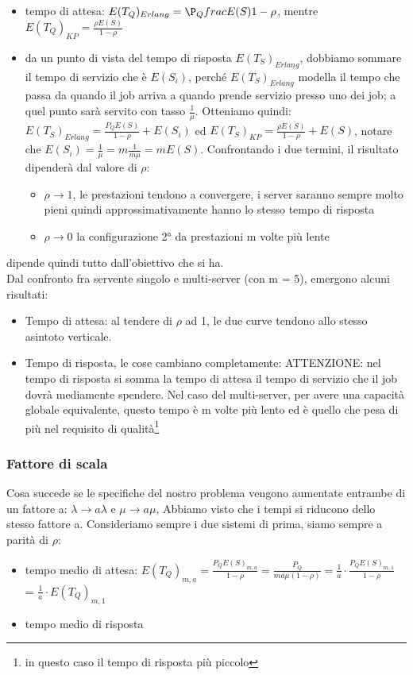 \documentclass{article}
\begin{document}
\begin{itemize}
\item tempo di attesa: $E(T_Q)_{Erlang} = \P_Qfrac{E(S)}{1 - \rho}$, mentre $E(T_Q)_{KP} = \frac{\rho E(S)}{1 - \rho}$
\item da un punto di vista del tempo di risposta $E(T_S)_{Erlang}$, dobbiamo sommare il tempo di servizio che è $E(S_i)$, perché $E(T_S)_{Erlang}$ modella il tempo che passa da quando il job arriva a quando prende servizio presso uno dei job; a quel punto sarà servito con tasso $\frac{1}{\mu}$.
Otteniamo quindi: $E(T_S)_{Erlang} = \frac{P_Q E(S)}{1 - \rho}+E(S_i)$ ed $E(T_S)_{KP} = \frac{\rho E(S)}{1 - \rho} + E(S)$, notare che $E(S_i) = \frac{1}{\mu} = m \frac{1}{m \mu} = mE(S)$. Confrontando i due termini, il risultato dipenderà dal valore di $\rho$:
\begin{itemize}
\item $\rho \longrightarrow 1$, le prestazioni tendono a convergere, i server saranno sempre molto pieni quindi approssimativamente hanno lo stesso tempo di risposta
\item $\rho \longrightarrow 0$ la configurazione 2° da prestazioni m volte più lente
\end{itemize}
\end{itemize}
dipende quindi tutto dall'obiettivo che si ha.\\ Dal confronto fra servente singolo e multi-server (con m = 5), emergono alcuni risultati:
\begin{itemize}
\item Tempo di attesa: al tendere di $\rho$ ad 1, le due curve tendono allo stesso asintoto verticale.
\item Tempo di risposta, le cose cambiano completamente: ATTENZIONE: nel tempo di risposta si somma la tempo di attesa il tempo di servizio che il job dovrà mediamente spendere. Nel caso del multi-server, per avere una capacità globale equivalente, questo tempo è m volte più lento ed è quello che pesa di più nel requisito di qualità\footnote{in questo caso il tempo di risposta più piccolo} 
\end{itemize}
\subsubsection{Fattore di scala}
Cosa succede se le specifiche del nostro problema vengono aumentate entrambe di un fattore a: $\lambda \rightarrow a\lambda$ e $\mu \rightarrow a\mu$, Abbiamo visto che i tempi si riducono dello stesso fattore a. Consideriamo sempre i due sistemi di prima, siamo sempre a parità di $\rho$:
\begin{itemize}
\item tempo medio di attesa: $E(T_Q)_{m,a} = \frac{P_Q E(S)_{m,a}}{1 - \rho} = \frac{P_Q}{ma \mu (1 - \rho)} = \frac{1}{a}\cdot \frac{P_Q E(S)_{m,1}}{1 - \rho}$ = $\frac{1}{a}\cdot E(T_Q)_{m,1}$ 
\item tempo medio di risposta
\end{itemize}
\end{document}
